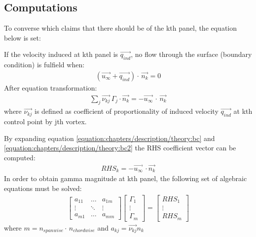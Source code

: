 \documentclass[letterpaper,10pt,english]{jupyterBook}
\begin{document}
\subsection{Computations}
\label{\detokenize{chapters/description/theory:computations}}
\sphinxAtStartPar
To converse  which claims that there should be  of the k\sphinxhyphen{}th panel, the equation below is set:

\sphinxAtStartPar
If the velocity induced at k\sphinxhyphen{}th panel is \(\overrightarrow{q_{ind}}\), no flow through the surface (boundary condition) is fulfield when:
\begin{equation}\label{equation:chapters/description/theory:bc}
\begin{split}
(\overrightarrow{u_{\infty}} + \overrightarrow{q_{ind}})\cdot\,\overrightarrow{n_k}=0
\end{split}
\end{equation}
\sphinxAtStartPar
After equation transformation:
\begin{equation}\label{equation:chapters/description/theory:bc2}
\begin{split}
\sum_{j} \overrightarrow{\nu_{kj}}  \, \Gamma_{j} \cdot \overrightarrow{n_k}=-\overrightarrow{u_{\infty}}\,\cdot\,\overrightarrow{n_k}
\end{split}
\end{equation}
\sphinxAtStartPar
where \(\overrightarrow{\nu_{kj}}\) is defined as coefficient of proportionality of induced velocity \(\overrightarrow{q_{ind}}\) at k\sphinxhyphen{}th control point by j\sphinxhyphen{}th vortex.

\sphinxAtStartPar
By expanding equation \eqref{equation:chapters/description/theory:bc} and \eqref{equation:chapters/description/theory:bc2} the RHS coefficient vector can be computed:
\begin{equation*}
\begin{split}
RHS_k=-\overrightarrow{u_{\infty}}\,\cdot\overrightarrow{n_k}
\end{split}
\end{equation*}
\sphinxAtStartPar
In order to obtain gamma magnitude at k\sphinxhyphen{}th panel, the following set of algebraic equations must be solved:
\label{equation:chapters/description/theory:004b06b5-1e33-42a1-b976-5e1e8e9b429c}\begin{gather}
    \begin{bmatrix} 
    a_{11} & \dots  & a_{1m}\\
    \vdots & \ddots & \vdots\\
    a_{m1} & \dots  & a_{mm}
    \end{bmatrix}
\begin{bmatrix} 
    \Gamma_{1} \\
    \vdots \\
    \Gamma_{m}
    \end{bmatrix}
 =
  \begin{bmatrix} 
    RHS_{1} \\
    \vdots \\
    RHS_{m}
    \end{bmatrix}
\end{gather}
\sphinxAtStartPar
where \(m=n_{spanwise}\cdot\,n_{chordwise}\) and \(a_{kj} = \overrightarrow{\nu_{kj}} n_k\)
\end{document}
